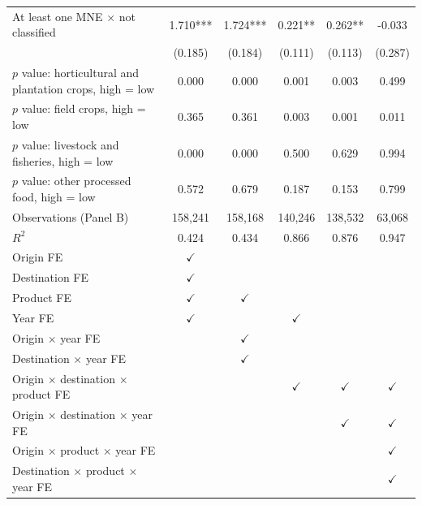 \begin{tabular}{l*{5}{c}}
At least one MNE $\times$ not classified & 1.710*** & 1.724*** & 0.221** & 0.262** & -0.033 \\
 & (0.185) & (0.184) & (0.111) & (0.113) & (0.287) \\
$p$ value: horticultural and plantation crops, high = low & 0.000 & 0.000 & 0.001 & 0.003 & 0.499 \\
$p$ value: field crops, high = low & 0.365 & 0.361 & 0.003 & 0.001 & 0.011 \\
$p$ value: livestock and fisheries, high = low & 0.000 & 0.000 & 0.500 & 0.629 & 0.994 \\
$p$ value: other processed food, high = low & 0.572 & 0.679 & 0.187 & 0.153 & 0.799 \\
Observations (Panel B) & 158,241 & 158,168 & 140,246 & 138,532 & 63,068 \\
$R^2$ & 0.424 & 0.434 & 0.866 & 0.876 & 0.947 \\
\midrule
Origin FE & $\checkmark$ &  &  &  &  \\
Destination FE & $\checkmark$ &  &  &  &  \\
Product FE & $\checkmark$ & $\checkmark$ &  &  &  \\
Year FE & $\checkmark$ &  & $\checkmark$ &  &  \\
Origin $\times$ year FE &  & $\checkmark$ &  &  &  \\
Destination $\times$ year FE &  & $\checkmark$ &  &  &  \\
Origin $\times$ destination $\times$ product FE &  &  & $\checkmark$ & $\checkmark$ & $\checkmark$ \\
Origin $\times$ destination $\times$ year FE &  &  &  & $\checkmark$ & $\checkmark$ \\
Origin $\times$ product $\times$ year FE &  &  &  &  & $\checkmark$ \\
Destination $\times$ product $\times$ year FE &  &  &  &  & $\checkmark$ \\
\bottomrule
\end{tabular}
